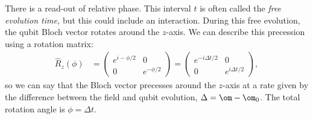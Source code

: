 \documentclass[a4paper, 11pt, normalem]{report}
\begin{document}
There is a read-out of relative phase.
This interval $t$ is often called the \emph{free evolution time,} but this could include an interaction.
During this free evolution, the qubit Bloch vector rotates around the $z$-axis.
We can describe this precession using a rotation matrix:
\begin{align}
    \hat{R}_z(\phi) &= \begin{pmatrix} e^{i-\phi/2} & 0 \\ 0 & e^{-\phi/2} \end{pmatrix} = \begin{pmatrix} e^{-i\Delta t/2} & 0 \\ 0 & e^{i\Delta t/2} \end{pmatrix},
\end{align}
so we can say that the Bloch vector precesses around the $z$-axis at a rate given by the difference between the field and qubit evolution, $\Delta=\om-\om_0$.
The total rotation angle is $\phi=\Delta t$.
\end{document}

